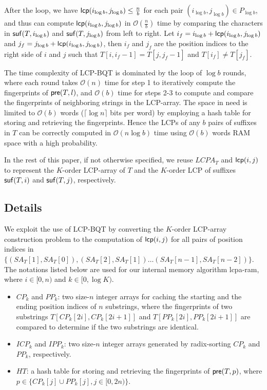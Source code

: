 \documentclass[10pt,journal,letterpaper,compsoc]{IEEEtran}
\begin{document}
\begin{CJK*}{GBK}{song}
After the loop, we have ${\sf lcp}(i_{\log b},j_{\log b}) \le \frac{n}{b}$ for each pair $(i_{\log b},j_{\log b}) \in P_{\log b}$, and thus can compute ${\sf lcp}(i_{\log b}, j_{\log b})$ in $\mathcal{O}(\frac{n}{b})$ time by comparing the characters in ${\sf suf}(T,i_{\log b})$ and ${\sf suf}(T,j_{\log b})$ from left to right. Let $i_{f} = i_{\log b} + {\sf lcp}(i_{\log b}, j_{\log b})$ and $j_{f}= j_{\log b} + {\sf lcp}(i_{\log b}, j_{\log b})$, then $i_{f}$ and $j_{f}$ are the position indices to the right side of $i$ and $j$ such that $T[i,i_{f}-1] = T[j,j_{f}-1]$ and $T[i_{f}] \neq T[j_{f}]$.

The time complexity of LCP-BQT is dominated by the loop of $\log b$ rounds, where each round takes $\mathcal{O}(n)$ time for step 1 to iteratively compute the fingerprints of ${\sf pre}(T,l)$, and $\mathcal{O}(b)$ time for steps 2-3 to compute and compare the fingerprints of neighboring strings in the LCP-array. The space in need is limited to $\mathcal{O}(b)$ words ($\lceil \log n\rceil$ bits per word) by employing a hash table for storing and retrieving the fingerprints. Hence the LCPs of any $b$ pairs of suffixes in $T$ can be correctly computed in $\mathcal{O}(n\log b)$ time using $\mathcal{O}(b)$ words RAM space with a high probability.

In the rest of this paper, if not otherwise specified, we reuse $LCPA_T$ and ${\sf lcp}(i,j)$ to represent the $K$-order LCP-array of $T$ and the $K$-order LCP of suffixes ${\sf suf}(T,i)$ and ${\sf suf}(T,j)$, respectively.
\subsection{Details}\label{subsec:implementation_in_ram}

We exploit the use of LCP-BQT by converting the $K$-order LCP-array construction problem to the computation of ${\sf lcp}(i,j)$ for all pairs of position indices in $\{(SA_T[1], SA_T[0]),(SA_T[2], SA_T[1])\ldots (SA_T[n-1], SA_T[n-2])\}$. The notations listed below are used for our internal memory algorithm lcpa-ram, where $i\in [0,n)$ and $k\in [0,\log K)$.

\begin{itemize}
\item $CP_k$ and $PP_k$: two size-$n$ integer arrays for caching the starting and the ending position indices of  $n$ substrings, where the fingerprints of two substrings $T[CP_k[2i],CP_k[2i+1]]$ and $T[PP_k[2i],PP_k[2i+1]]$ are compared to determine if the two substrings are identical.
\item $ICP_k$ and $IPP_k$: two size-$n$ integer arrays generated by radix-sorting $CP_k$ and $PP_k$, respectively.
\item $HT$: a hash table for storing and retrieving the fingerprints of ${\sf pre}(T,p)$, where $p\in \{CP_k[j] \cup PP_k[j], j\in[0,2n)\}$.
\end{itemize}


\end{CJK*}
\end{document}
